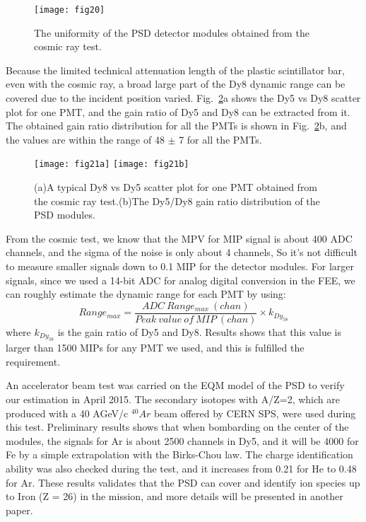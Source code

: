 \documentclass[preprint]{elsarticle}
\begin{document}
\begin{figure}
 \centering
 \texttt{[image: fig20]}
\caption{The uniformity of the PSD detector modules obtained from the cosmic ray test.}
\label{fig:fig20}
\end{figure}

Because the limited technical attenuation length of the plastic scintillator bar, even with the cosmic ray, a broad large part of the Dy8 dynamic range can be covered due to the incident position varied. Fig.~\ref{fig:fig21}a shows the Dy5 vs Dy8 scatter plot for one PMT, and the gain ratio of Dy5 and Dy8 can be extracted from it. The obtained gain ratio distribution for all the PMTs is shown in Fig.~\ref{fig:fig21}b, and the values are within the range of 48 $\pm$ 7 for all the PMTs.

\begin{figure}[!ht]
	\centering
	\texttt{[image: fig21a]}
	\texttt{[image: fig21b]}
	\caption{(a)A typical Dy8 vs Dy5 scatter plot for one PMT obtained from the cosmic ray test.(b)The Dy5/Dy8 gain ratio distribution of the PSD modules.}
     \label{fig:fig21}
\end{figure}

From the cosmic test, we know that the MPV for MIP signal is about 400 ADC channels, and the sigma of the noise is only about 4 channels, So it's not difficult to measure smaller signals down to 0.1 MIP for the detector modules. For larger signals, since we used a 14-bit ADC for analog digital conversion in the FEE, we can roughly estimate the dynamic range for each PMT by using:
\begin{equation}
Range_{max}=\frac{ADC\ Range_{max}\ (chan)}{Peak\ value\ of\ MIP\ (chan)}\times k_{Dy_{58}}
\end{equation}
where $k_{Dy_{58}}$ is the gain ratio of Dy5 and Dy8. Results shows that this value is larger than 1500 MIPs for any PMT we used, and this is fulfilled the requirement.

An accelerator beam test was carried on the EQM model of the PSD to verify our estimation in April 2015. The secondary isotopes with A/Z=2, which are produced with a 40 AGeV/c $^{40}{Ar}$ beam offered by CERN SPS, were used during this test. Preliminary results shows that when bombarding on the center of the modules, the signals for Ar is about 2500 channels in Dy5, and it will be 4000 for Fe by a simple extrapolation with the Birks-Chou law. The charge identification ability was also checked during the test, and it increases from 0.21 for He to 0.48 for Ar. These results validates that the PSD can cover and identify ion species up to Iron (Z = 26) in the mission, and more details will be presented in another paper.
\end{document}

